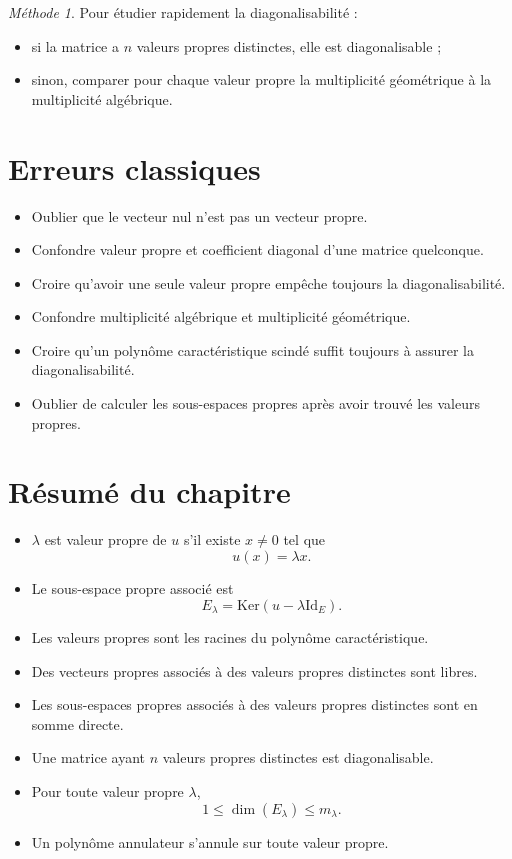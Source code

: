 \documentclass[11pt,a4paper]{article}
\theoremstyle{remark}
\newtheorem*{methode}{Méthode}
\newcommand{\Ker}{\mathrm{Ker}}
\newcommand{\id}{\mathrm{Id}}
\begin{document}
\begin{methode}
Pour étudier rapidement la diagonalisabilité :
\begin{itemize}
    \item si la matrice a \(n\) valeurs propres distinctes, elle est diagonalisable ;
    \item sinon, comparer pour chaque valeur propre la multiplicité géométrique à la multiplicité algébrique.
\end{itemize}
\end{methode}

\section{Erreurs classiques}

\begin{itemize}
    \item Oublier que le vecteur nul n’est pas un vecteur propre.
    \item Confondre valeur propre et coefficient diagonal d’une matrice quelconque.
    \item Croire qu’avoir une seule valeur propre empêche toujours la diagonalisabilité.
    \item Confondre multiplicité algébrique et multiplicité géométrique.
    \item Croire qu’un polynôme caractéristique scindé suffit toujours à assurer la diagonalisabilité.
    \item Oublier de calculer les sous-espaces propres après avoir trouvé les valeurs propres.
\end{itemize}

\section{Résumé du chapitre}

\begin{itemize}
    \item \(\lambda\) est valeur propre de \(u\) s’il existe \(x\neq 0\) tel que
    \[
    u(x)=\lambda x.
    \]
    \item Le sous-espace propre associé est
    \[
    E_\lambda=\Ker(u-\lambda\id_E).
    \]
    \item Les valeurs propres sont les racines du polynôme caractéristique.
    \item Des vecteurs propres associés à des valeurs propres distinctes sont libres.
    \item Les sous-espaces propres associés à des valeurs propres distinctes sont en somme directe.
    \item Une matrice ayant \(n\) valeurs propres distinctes est diagonalisable.
    \item Pour toute valeur propre \(\lambda\),
    \[
    1\le \dim(E_\lambda)\le m_\lambda.
    \]
    \item Un polynôme annulateur s’annule sur toute valeur propre.
\end{itemize}
\end{document}
